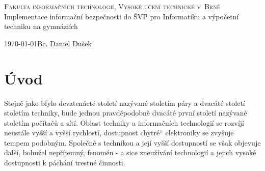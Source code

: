 \documentclass[a4paper, 11pt]{article}
\title{\thesisname}
\author{Bc. Daniel Dušek}
\providecommand{\uv}[1]{\quotedblbase #1\textquotedblleft}
\newcommand{\thesisname}{Implementace informační bezpečnosti do ŠVP pro Informatiku a výpočetní techniku na gymnáziích}
\begin{document}
\thispagestyle{empty}
\begin{center}
\Huge
\textsc{Fakulta informačních technologií, Vysoké učení technické v~Brně}\\
\LARGE
{}
\thesisname
{}
\end{center}
{\Large \today \hfill Bc. Daniel Dušek}





\newpage
\tableofcontents

\newpage
\setcounter{page}{1}
\section{Úvod}


% 




Stejně jako bfylo devatenácté století nazývané stoletím páry a dvacáté století stoletím techniky, bude jednou pravděpodobně dvacáté první století nazývané stoletím počítačů a sítí. Oblast techniky a informačních technologií se rozvíjí neustále vyšší a vyšší rychlostí, dostupnost \uv{chytré} elektroniky se zvyšuje tempem podobným. Společně s technikou a její vyšší dostupností se však objevuje další, bohužel nepříjemný, fenomén \-- a sice zneužívání technologií a jejich vysoké dostupnosti k páchání trestné činnosti. 
\end{document}
